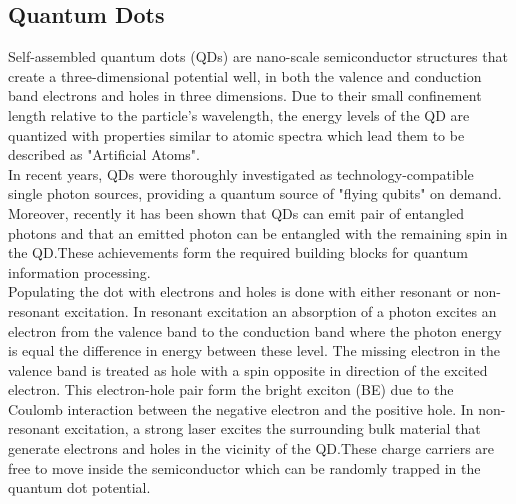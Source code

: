\subsection{Quantum Dots}
Self-assembled quantum dots (QDs) are nano-scale semiconductor structures that create a three-dimensional potential well, in both the valence and conduction band electrons and holes in three dimensions. Due to their small confinement length relative to the particle's wavelength, the energy levels of the QD are quantized with properties similar to atomic spectra which lead them to be described as "Artificial Atoms"\cite{Kastner1993}. \\
In recent years, QDs were thoroughly investigated as technology-compatible single photon sources\cite{Dekel2000}, providing a quantum source of "flying qubits" on demand. Moreover, recently it has been shown that QDs can emit pair of entangled photons and that an emitted photon can be entangled with the remaining spin in the QD.These achievements form the required building blocks for quantum information processing.\\
Populating the dot with electrons and holes is done with either resonant or non-resonant excitation. In resonant excitation an absorption of a photon excites an electron from the valence band to the conduction band where the photon energy is equal the difference in energy between these level. The missing electron in the valence band is treated as hole with a spin opposite in direction of the excited electron. This electron-hole pair form the bright exciton (BE) due to the Coulomb interaction between the negative electron and the positive hole. In non-resonant excitation, a strong laser excites the surrounding bulk material that generate electrons and holes in the vicinity of the QD.These charge carriers are free to move inside the semiconductor which can  be randomly trapped in the quantum dot potential. \\

